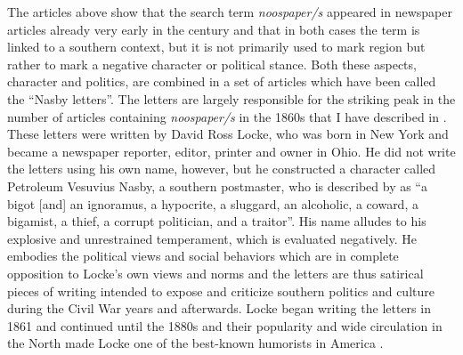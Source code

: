 The articles above show that the search term \emph{noospaper/s} appeared in newspaper articles already very early in the century and that in both cases the term is linked to a southern context, but it is not primarily used to mark region but rather to mark a negative character or political stance. Both these aspects, character and politics, are combined in a set of articles which have been called the “Nasby letters”. The letters are largely responsible for the striking peak in the number of articles containing \emph{noospaper/s} in the 1860s that I have described in . These letters were written by David Ross Locke, who was born in New York and became a newspaper reporter, editor, printer and owner in Ohio. He did not write the letters using his own name, however, but he constructed a character called Petroleum Vesuvius Nasby, a southern postmaster, who is described by \citet[144--145]{Blair1983} as “a bigot [and] an ignoramus, a hypocrite, a sluggard, an alcoholic, a coward, a bigamist, a thief, a corrupt politician, and a traitor”. His name alludes to his explosive and unrestrained temperament, which is evaluated negatively. He embodies the political views and social behaviors which are in complete opposition to Locke’s own views and norms and the letters are thus satirical pieces of writing intended to expose and criticize southern politics and culture during the Civil War years and afterwards. Locke began writing the letters in 1861 and continued until the 1880s and their popularity and wide circulation in the North made Locke one of the best-known humorists in America \citep[144]{Blair1983}.


